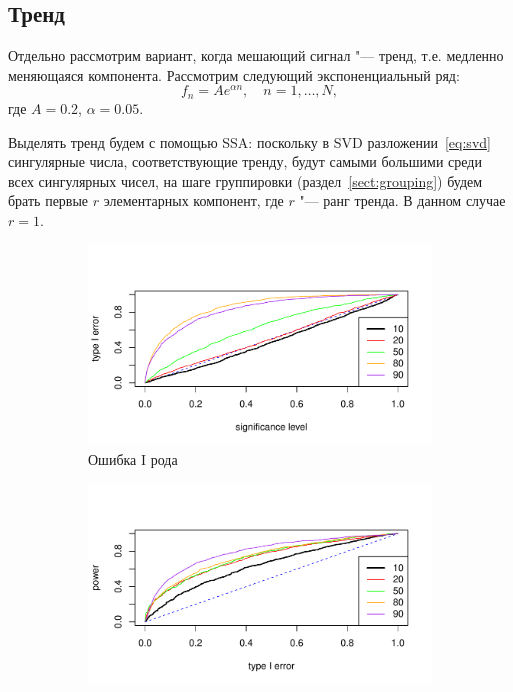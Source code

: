 \documentclass[specialist,
substylefile = spbu_report.rtx,
subf,href,colorlinks=true, 12pt]{disser}
\theoremstyle{definition}
\begin{document}
\subsection{Тренд}
Отдельно рассмотрим вариант, когда мешающий сигнал "--- тренд, т.е. медленно меняющаяся компонента. Рассмотрим следующий экспоненциальный ряд:
\[
f_n=A e^{\alpha n},\quad n=1,\ldots,N,
\] 
где $A=0.2$, $\alpha=0.05$. 

Выделять тренд будем с помощью SSA: поскольку в SVD разложении~\eqref{eq:svd} сингулярные числа, соответствующие тренду, будут самыми большими среди всех сингулярных чисел, на шаге группировки (раздел~\ref{sect:grouping}) будем брать первые $r$ элементарных компонент, где $r$ "--- ранг тренда. В данном случае $r=1$.

\begin{figure}[h!]
	\captionsetup[subfigure]{justification=Centering}
	\begin{subfigure}[t]{0.5\textwidth}
		\centering
		\includegraphics[width=\textwidth]{img/type1error_trend.pdf}
		\caption{Ошибка I рода}
		\label{fig:trend_type1error}
	\end{subfigure}\hspace{\fill}
	\begin{subfigure}[t]{0.5\textwidth}
		\centering
		\includegraphics[width=\textwidth]{img/roc_trend.pdf}

\end{subfigure}
\end{figure}
\end{document}
